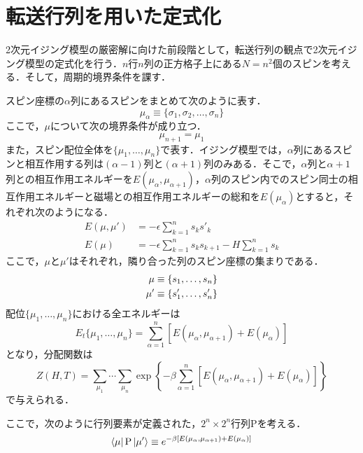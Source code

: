 \documentclass[a4paper,11pt]{jsreport}
\begin{document}
\section{転送行列を用いた定式化}
2次元イジング模型の厳密解に向けた前段階として，転送行列の観点で2次元イジング模型の定式化を行う．$n$行$n$列の正方格子上にある$N=n^2$個のスピンを考える．そして，周期的境界条件を課す．\par
スピン座標の$\alpha$列にあるスピンをまとめて次のように表す．
\begin{equation}
  \mu_{\alpha}
  \equiv \{\sigma_1, \sigma_2, \dots, \sigma_n\}
\end{equation}
ここで，$\mu$について次の境界条件が成り立つ．
\begin{equation}
  \mu_{n+1} = \mu_1 
\end{equation}
また，スピン配位全体を$\{\mu_1, \dots, \mu_n\}$で表す．イジング模型では，$\alpha$列にあるスピンと相互作用する列は$(\alpha-1)$列と$(\alpha+1)$列のみある．そこで，$\alpha$列と$\alpha+1$列との相互作用エネルギーを$E(\mu_{\alpha}, \mu_{\alpha+1})$，$\alpha$列のスピン内でのスピン同士の相互作用エネルギーと磁場との相互作用エネルギーの総和を$E(\mu_{\alpha})$とすると，それぞれ次のようになる．
\begin{align}
  E(\mu, \mu')
   & = -\epsilon \sum_{k=1}^n s_k s'_k                         \\
  E(\mu)
   & = -\epsilon \sum_{k=1}^n s_k s_{k+1} - H \sum_{k=1}^n s_k
\end{align}
ここで，$\mu$と$\mu'$はそれぞれ，隣り合った列のスピン座標の集まりである．
\begin{align}
  \mu  & \equiv \{s_1, \dots, s_n \} \notag \\
  \mu' & \equiv \{s'_1, \dots, s'_n \}
  \label{イジングエネルギー２}
\end{align}
配位$\{\mu_1, \dots, \mu_n\}$における全エネルギーは
\begin{equation}
  E_t\{\mu_1, \dots, \mu_n \}
  = \sum_{\alpha=1}^n [E(\mu_{\alpha}, \mu_{\alpha+1}) + E(\mu_{\alpha})]
\end{equation}
となり，分配関数は
\begin{equation}
  Z(H,T)
  = \sum_{\mu_1} \cdots \sum_{\mu_n} \exp{\left\{ -\beta \sum_{\alpha=1}^n [E(\mu_{\alpha}, \mu_{\alpha+1}) + E(\mu_{\alpha})] \right\}}
\end{equation}
で与えられる．\par
ここで，次のように行列要素が定義された，$2^n \times 2^n$行列$\mathrm{P}$を考える．
\begin{equation}
  \bra{\mu} \mathrm{P} \ket{\mu'} \equiv e^{-\beta [E(\mu_{\alpha}, \mu_{\alpha+1}) + E(\mu_{\alpha})]}
  \label{行列要素}
\end{equation}
\end{document}
